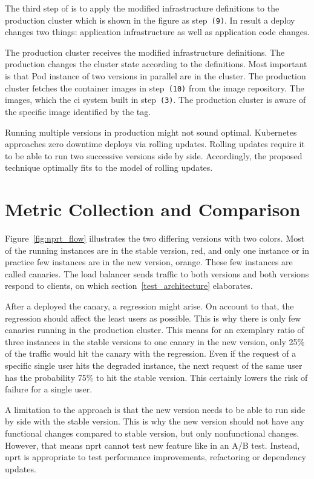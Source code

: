 The third step of \deployer{} is to apply the modified infrastructure definitions to the
production cluster which is shown in the figure as step~\texttt{(9)}. In result a deploy
changes two things: application infrastructure as well as application code changes.

The production cluster receives the modified infrastructure definitions. The production
changes the cluster state according to the definitions. Most important is that Pod
instance of two versions in parallel are in the cluster. The production cluster fetches
the container images in step~\texttt{(10)} from the image repository. The images, which
the \gls{ci} system built in step~\texttt{(3)}. The production cluster is aware of the
specific image identified by the tag.

Running multiple versions in production might not sound optimal. Kubernetes approaches zero downtime
deploys via rolling updates. Rolling updates require it to be able to run two successive versions
side by side. Accordingly, the proposed technique optimally fits to the model of rolling updates.

\section{Metric Collection and Comparison}

Figure~\ref{fig:nprt_flow} illustrates the two differing versions with two colors. Most of
the running instances are in the stable version, red, and only one instance or in practice
few instances are in the new version, orange. These few instances are called canaries.
The load balancer sends traffic to both versions and both versions respond to clients, on
which section~\ref{test_architecture} elaborates.

After a \deployer{} deployed the canary, a regression might arise. On account to that,
the regression should affect the least users as possible. This is why there is only few
canaries running in the production cluster. This means for an exemplary ratio of three
instances in the stable versions to one canary in the new version, only 25\% of the
traffic would hit the canary with the regression. Even if the request of a specific
single user hits the degraded instance, the next request of the same user has the
probability 75\% to hit the stable version. This certainly lowers the risk of failure
for a single user.

A limitation to the approach is that the new version needs to be able to run side by
side with the stable version. This is why the new version should not have any
functional changes compared to stable version, but only nonfunctional changes. However, that
means \gls{nprt} cannot test new feature like in an A/B test. Instead, \gls{nprt} is
appropriate to test performance improvements, refactoring or dependency updates.

